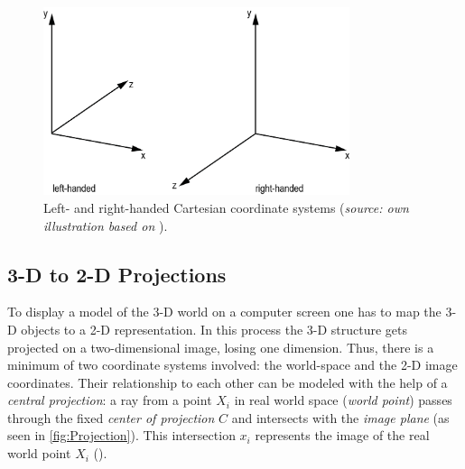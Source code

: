 \begin{figure}[htbp]
		\centering
		\includegraphics[width=0.8\textwidth]{figures/CoordinateSystems}
		\caption[Left- and right-handed Cartesian coordinate systems]{Left- and right-handed Cartesian coordinate systems (\textit{source: own illustration based on} \cite[p.167]{Gregory.2014}).}
		\label{fig:CoordinateSys}
\end{figure}

\subsection{3-D to 2-D Projections}\label{ssec:projection}
To display a model of the 3-D world on a computer screen one has to map the 3-D objects to a 2-D representation. In this process the 3-D structure gets projected on a two-dimensional image, losing one dimension. Thus, there is a minimum of two coordinate systems involved: the world-space and the 2-D image coordinates. Their relationship to each other can be modeled with the help of a \textit{central projection}: a ray from a point $X_i$ in real world space (\textit{world point}) passes through the fixed \textit{center of projection} $C$ and intersects with the \textit{image plane} (as seen in \autoref{fig:Projection}). This intersection $x_i$ represents the image of the real world point $X_i$ (\cite[p.6 et seq.]{Hartley.2011}).

